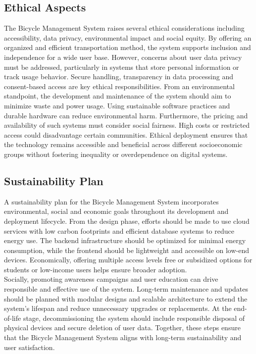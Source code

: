 \subsection{Ethical Aspects}
The Bicycle Management System raises several ethical considerations including accessibility, data privacy, environmental impact and social equity. By offering an organized and efficient transportation method, the system supports inclusion and independence for a wide user base.
However, concerns about user data privacy must be addressed, particularly in systems that store personal information or track usage behavior. Secure handling, transparency in data processing and consent-based access are key ethical responsibilities.
From an environmental standpoint, the development and maintenance of the system should aim to minimize waste and power usage. Using sustainable software practices and durable hardware can reduce environmental harm.
Furthermore, the pricing and availability of such systems must consider social fairness. High costs or restricted access could disadvantage certain communities. Ethical deployment ensures that the technology remains accessible and beneficial across different socioeconomic groups without fostering inequality or overdependence on digital systems.\cite{4.1.3}
\subsection{Sustainability Plan}A sustainability plan for the Bicycle Management System incorporates environmental, social and economic goals throughout its development and deployment lifecycle. From the design phase, efforts should be made to use cloud services with low carbon footprints and efficient database systems to reduce energy use.
The backend infrastructure should be optimized for minimal energy consumption, while the frontend should be lightweight and accessible on low-end devices. Economically, offering multiple access levels free or subsidized options for students or low-income users helps ensure broader adoption.\\
Socially, promoting awareness campaigns and user education can drive responsible and effective use of the system. Long-term maintenance and updates should be planned with modular designs and scalable architecture to extend the system’s lifespan and reduce unnecessary upgrades or replacements.
At the end-of-life stage, decommissioning the system should include responsible disposal of physical devices and secure deletion of user data. Together, these steps ensure that the Bicycle Management System aligns with long-term sustainability and user satisfaction.\cite{4.1.4}

